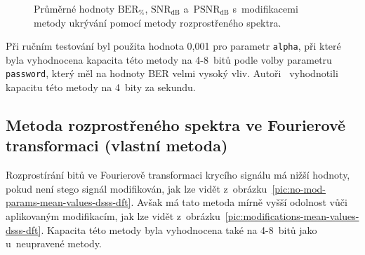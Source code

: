 \begin{figure}[H]
    \table
    \centering
    \caption{Průměrné hodnoty $\mathrm{BER}_{\%}$, $\mathrm{SNR}_\mathrm{dB}$
    a~$\mathrm{PSNR}_\mathrm{dB}$ s~modifikacemi metody ukrývání pomocí
    metody rozprostřeného spektra.}
    \label{pic:modifications-mean-values-dsss}
\end{figure}

Při ručním testování byl použita hodnota 0,001 pro parametr \texttt{alpha}, při
které byla vyhodnocena kapacita této metody na 4-8~bitů podle volby parametru
\texttt{password}, který měl na hodnoty BER velmi vysoký vliv.
Autoři~\cite{Bender1996} vyhodnotili kapacitu této metody na 4~bity za sekundu.

\subsection*{Metoda rozprostřeného spektra ve Fourierově transformaci (vlastní
metoda)}

Rozprostírání bitů ve Fourierově transformaci krycího signálu má nižší hodnoty,
pokud není stego signál modifikován, jak lze vidět
z~obrázku~\ref{pic:no-mod-params-mean-values-dsss-dft}. Avšak má tato metoda
mírně vyšší odolnost vůči aplikovaným modifikacím, jak lze vidět
z~obrázku~\ref{pic:modifications-mean-values-dsss-dft}. Kapacita této metody
byla vyhodnocena také na 4-8~bitů jako u~neupravené metody.

